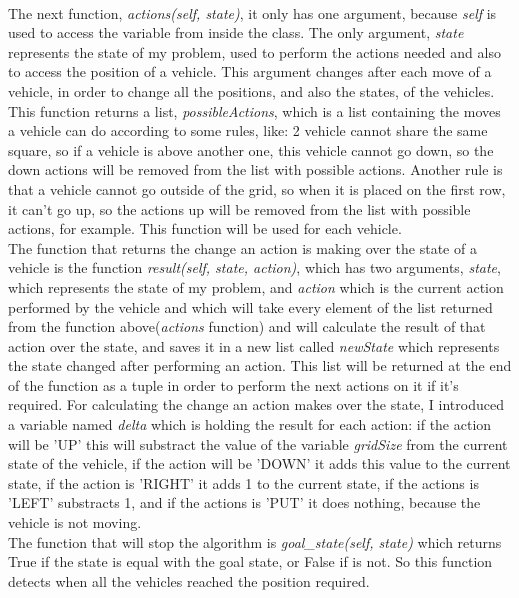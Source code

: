 \documentclass[14pt]{article}
\begin{document}
\vspace{2.5 mm}
\\The next function, \textit{actions(self, state)}, it only has one argument, because \textit{self} is used to access the variable from inside the class. The only argument, \textit{state} represents the state of my problem, used to perform the actions needed and also to access the position of a vehicle. This argument changes after each move of a vehicle, in order to change all the positions, and also the states, of the vehicles. This function returns a list, \textit{possibleActions}, which is a list  containing the moves a vehicle can do according to some rules, like: 2 vehicle cannot share the same square, so if a vehicle is above another one, this vehicle cannot go down, so the down actions will be removed from the list with possible actions. Another rule is that a vehicle cannot go outside of the grid, so when it is placed on the first row, it can't go up, so the actions up will be removed from the list with possible actions, for example. This function will be used for each vehicle.
\vspace{2.5 mm}
\\The function that returns the change an action is making over the state of a vehicle is the function \textit{result(self, state, action)}, which has two arguments, \textit{state}, which represents the state of my problem, and \textit{action} which is the current action performed by the vehicle and which will take every element of the list returned from the function above(\textit{actions} function) and will calculate the result of that action over the state, and saves it in a new list called \textit{newState} which represents the state changed after performing an action. This list will be returned at the end of the function as a tuple in order to perform the next actions on it if it's required. For calculating the change an action makes over the state, I introduced a variable named \textit{delta} which is holding the result for each action: if the action will be 'UP' this will substract the value of the variable \textit{gridSize} from the current state of the vehicle, if the action will be 'DOWN' it adds this value to the current state, if the action is 'RIGHT' it adds 1 to the current state, if the actions is 'LEFT' substracts 1, and if the actions is 'PUT' it does nothing, because the vehicle is not moving.
\vspace{2.5 mm}
\\The function that will stop the algorithm is \textit{goal\_state(self, state)} which returns True if the state is equal with the goal state, or False if is not. So this function detects when all the vehicles reached the position required.
\end{document}
